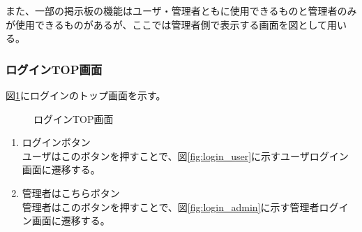 \documentclass[a4j]{jarticle}
\begin{document}
また、一部の掲示板の機能はユーザ・管理者ともに使用できるものと管理者のみが使用できるものがあるが、ここでは管理者側で表示する画面を図として用いる。


\subsubsection{ログインTOP画面}
図\ref{fig:login_top}にログインのトップ画面を示す。
\begin{figure}[H]
\centering
{}
\caption{ログインTOP画面}
\label{fig:login_top}
\end{figure}
\begin{enumerate}
  \renewcommand{\labelenumi}{\textcircled{\scriptsize \theenumi}}

\item ログインボタン\\
ユーザはこのボタンを押すことで、図\ref{fig:login_user}に示すユーザログイン画面に遷移する。
\item 管理者はこちらボタン\\
管理者はこのボタンを押すことで、図\ref{fig:login_admin}に示す管理者ログイン画面に遷移する。
\end{enumerate}
\end{document}
